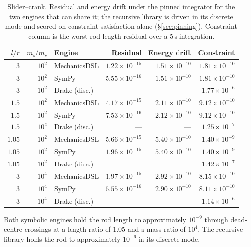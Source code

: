 \documentclass[review,12pt]{elsarticle}
\begin{document}
\begin{table}[!htbp]
\centering
\caption{Slider--crank. Residual and energy drift under the pinned integrator
for the two engines that can share it; the recursive library is driven in its
discrete mode and scored on constraint satisfaction alone
(\S\ref{sec:pinning}). Constraint column is the worst rod-length residual over
a 5\,s integration.}
\label{tab:slidercrank}
\begin{tabular}{@{}rrlrrr@{}}
\toprule
$l/r$ & $m_s/m_c$ & \textbf{Engine} & \textbf{Residual} & \textbf{Energy drift} & \textbf{Constraint} \\
\midrule
$3$    & $10^{2}$ & MechanicsDSL   & $1.22\times10^{-15}$ & $1.51\times10^{-10}$ & $1.81\times10^{-10}$ \\
$3$    & $10^{2}$ & SymPy          & $5.55\times10^{-16}$ & $1.51\times10^{-10}$ & $1.81\times10^{-10}$ \\
$3$    & $10^{2}$ & Drake (disc.)  & ---                  & ---                  & $1.77\times10^{-6}$ \\
$1.5$  & $10^{2}$ & MechanicsDSL   & $4.17\times10^{-15}$ & $2.11\times10^{-10}$ & $9.12\times10^{-10}$ \\
$1.5$  & $10^{2}$ & SymPy          & $7.53\times10^{-16}$ & $2.12\times10^{-10}$ & $9.12\times10^{-10}$ \\
$1.5$  & $10^{2}$ & Drake (disc.)  & ---                  & ---                  & $1.25\times10^{-7}$ \\
$1.05$ & $10^{2}$ & MechanicsDSL   & $5.66\times10^{-15}$ & $5.40\times10^{-10}$ & $1.40\times10^{-9}$ \\
$1.05$ & $10^{2}$ & SymPy          & $1.96\times10^{-15}$ & $5.40\times10^{-10}$ & $1.40\times10^{-9}$ \\
$1.05$ & $10^{2}$ & Drake (disc.)  & ---                  & ---                  & $1.42\times10^{-7}$ \\
$3$    & $10^{4}$ & MechanicsDSL   & $1.97\times10^{-15}$ & $2.92\times10^{-10}$ & $8.15\times10^{-10}$ \\
$3$    & $10^{4}$ & SymPy          & $5.55\times10^{-16}$ & $2.90\times10^{-10}$ & $8.11\times10^{-10}$ \\
$3$    & $10^{4}$ & Drake (disc.)  & ---                  & ---                  & $1.14\times10^{-6}$ \\
\bottomrule
\end{tabular}
\end{table}

\label{sec:slidercrank-results}
Both symbolic engines hold the rod length to approximately $10^{-9}$ through
dead-centre crossings at a length ratio of $1.05$ and a mass ratio of $10^{4}$.
The recursive library holds the rod to approximately $10^{-6}$ in its discrete
mode.
\end{document}
